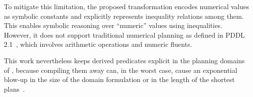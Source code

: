 To mitigate this limitation, the proposed \owltopddl transformation encodes numerical values as symbolic constants and explicitly represents inequality relations among them. This enables symbolic reasoning over ``numeric'' values using inequalities. However, it does not support traditional numerical planning as defined in PDDL 2.1~\cite{fox2003pddl2}, which involves arithmetic operations and numeric fluents.

This work nevertheless keeps derived predicates explicit in the planning domains of \planta, because compiling them away can, in the worst case, cause an exponential blow-up in the size of the domain formulation or in the length of the shortest plans~\cite{THIEBAUX200538}.

